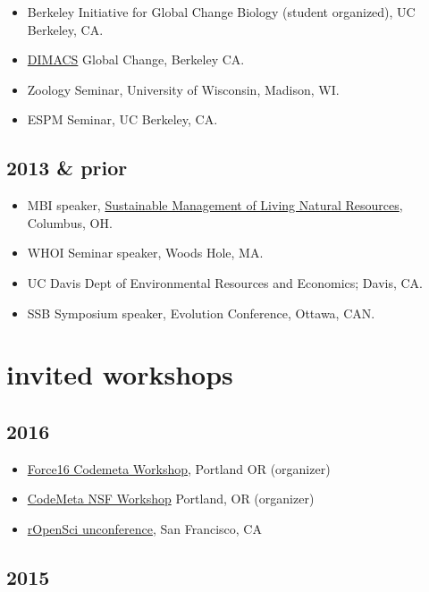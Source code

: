 \documentclass[10pt,sans]{moderncv}        %
\providecommand{\tightlist}{%
    \setlength{\itemsep}{0pt}\setlength{\parskip}{0pt}}
\begin{document}
\begin{itemize}
\tightlist
\item
  Berkeley Initiative for Global Change Biology (student organized), UC
  Berkeley, CA.
\item
  \href{http://dimacs.rutgers.edu/Workshops/GlobalChange/announcement.html}{DIMACS}
  Global Change, Berkeley CA.
\item
  Zoology Seminar, University of Wisconsin, Madison, WI.
\item
  ESPM Seminar, UC Berkeley, CA.
\end{itemize}

\subsection{2013 \& prior}\label{prior}

\begin{itemize}
\tightlist
\item
  MBI speaker,
  \href{http://www.mbi.ohio-state.edu/2013/ws3description.html}{Sustainable
  Management of Living Natural Resources}, Columbus, OH.
\item
  WHOI Seminar speaker, Woods Hole, MA.
\item
  UC Davis Dept of Environmental Resources and Economics; Davis, CA.
\item
  SSB Symposium speaker, Evolution Conference, Ottawa, CAN.
\end{itemize}

\section{invited workshops}\label{invited-workshops}

\subsection{2016}\label{section-2}

\begin{itemize}
\tightlist
\item
  \href{http://sched.co/5wK5}{Force16 Codemeta Workshop}, Portland OR
  (organizer)
\item
  \href{https://codemeta.github.io}{CodeMeta NSF Workshop} Portland, OR
  (organizer)
\item
  \href{http://unconf16.ropensci.org}{rOpenSci unconference}, San
  Francisco, CA
\end{itemize}

\subsection{2015}\label{section-3}
\end{document}
